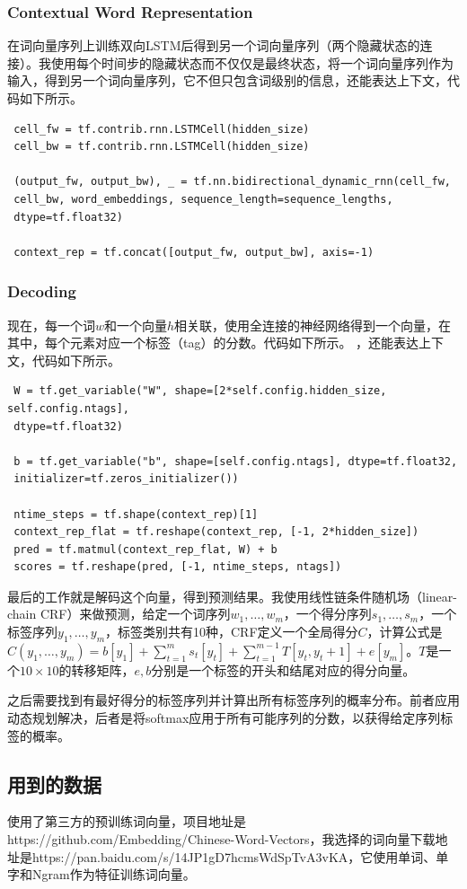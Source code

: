 \documentclass[UTF8]{article}
\begin{document}
\subsubsection{Contextual Word Representation}
在词向量序列上训练双向LSTM后得到另一个词向量序列（两个隐藏状态的连接）。我使用每个时间步的隐藏状态而不仅仅是最终状态，将一个词向量序列作为输入，得到另一个词向量序列，它不但只包含词级别的信息，还能表达上下文，代码如下所示。
 \begin{verbatim}
 cell_fw = tf.contrib.rnn.LSTMCell(hidden_size)
 cell_bw = tf.contrib.rnn.LSTMCell(hidden_size)
 
 (output_fw, output_bw), _ = tf.nn.bidirectional_dynamic_rnn(cell_fw,
 cell_bw, word_embeddings, sequence_length=sequence_lengths,
 dtype=tf.float32)
 
 context_rep = tf.concat([output_fw, output_bw], axis=-1)
 \end{verbatim}
 \subsubsection{Decoding}
 现在，每一个词$w$和一个向量$h$相关联，使用全连接的神经网络得到一个向量，在其中，每个元素对应一个标签（tag）的分数。代码如下所示。
 ，还能表达上下文，代码如下所示。
 \begin{verbatim}
 W = tf.get_variable("W", shape=[2*self.config.hidden_size, self.config.ntags],
 dtype=tf.float32)
 
 b = tf.get_variable("b", shape=[self.config.ntags], dtype=tf.float32,
 initializer=tf.zeros_initializer())
 
 ntime_steps = tf.shape(context_rep)[1]
 context_rep_flat = tf.reshape(context_rep, [-1, 2*hidden_size])
 pred = tf.matmul(context_rep_flat, W) + b
 scores = tf.reshape(pred, [-1, ntime_steps, ntags])
 \end{verbatim}
 
 最后的工作就是解码这个向量，得到预测结果。我使用线性链条件随机场（linear-chain CRF）来做预测，给定一个词序列$w_1,\dots,w_m$，一个得分序列$s_1,\dots,s_m$，一个标签序列$y_1,\dots,y_m$，标签类别共有10种，CRF定义一个全局得分$C$，计算公式是$C(y_1,\dots,y_m)=b[y_1]+\sum_{t=1}^{m}s_t[y_t]+\sum_{t=1}^{m-1}T[y_t,y_t+1]+e[y_m]$。$T$是一个$10\times10$的转移矩阵，$e,b$分别是一个标签的开头和结尾对应的得分向量。
 
 之后需要找到有最好得分的标签序列并计算出所有标签序列的概率分布。前者应用动态规划解决，后者是将softmax应用于所有可能序列的分数，以获得给定序列标签的概率。
 \subsection{用到的数据}
 使用了第三方的预训练词向量，项目地址是https://github.com/Embedding/Chinese-Word-Vectors，我选择的词向量下载地址是https://pan.baidu.com/s/14JP1gD7hcmsWdSpTvA3vKA，它使用单词、单字和Ngram作为特征训练词向量。
\end{document}

